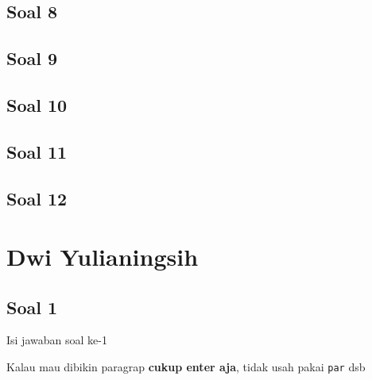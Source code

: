 \subsection{Soal 8}

\hfill \break
 

 \subsection{Soal 9}

\hfill \break
 

 \subsection{Soal 10}

\hfill \break
 

 \subsection{Soal 11}

\hfill \break
 

 \subsection{Soal 12}

\hfill \break
 

\section{Dwi Yulianingsih}
\subsection{Soal 1}
Isi jawaban soal ke-1

Kalau mau dibikin paragrap \textbf{cukup enter aja}, tidak usah pakai \verb|par| dsb




